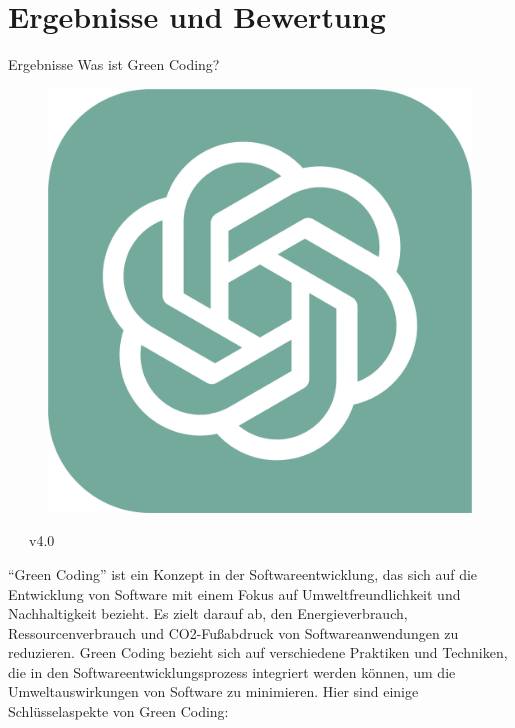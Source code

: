 \documentclass[10pt,aspectratio=169]{beamer}
\begin{document}
\section{Ergebnisse und Bewertung}
\begin{frame}{Ergebnisse}
    Was ist Green Coding?
    
    \begin{minipage}{0.05\linewidth}
        \scriptsize
        \begin{figure}[!ht]
            \includegraphics[width=\linewidth]{assets/ChatGPT_logo.pdf}
        \end{figure}
        \vspace{-2mm}
        ~~~v4.0
        \vspace{4.8cm}
    \end{minipage}
    \begin{minipage}{0.94\linewidth}
    \begin{framed}
        \footnotesize
        ``Green Coding'' ist ein Konzept in der Softwareentwicklung, das sich auf die Entwicklung von Software mit einem Fokus auf Umweltfreundlichkeit und Nachhaltigkeit bezieht. Es zielt darauf ab, den Energieverbrauch, Ressourcenverbrauch und CO2-Fußabdruck von Softwareanwendungen zu reduzieren. Green Coding bezieht sich auf verschiedene Praktiken und Techniken, die in den Softwareentwicklungsprozess integriert werden können, um die Umweltauswirkungen von Software zu minimieren. Hier sind einige Schlüsselaspekte von Green Coding:\\[2mm]

\end{framed}
\end{minipage}
\end{frame}
\end{document}
